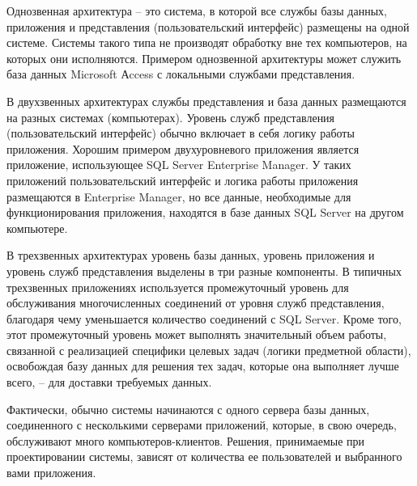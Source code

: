 \bigskip
Однозвенная архитектура – это система, в которой все службы базы данных, приложения и представления (пользовательский интерфейс) размещены на одной системе. Системы такого типа не производят обработку вне тех компьютеров, на которых они исполняются. Примером однозвенной архитектуры может служить база данных Microsoft Аccess с локальными службами представления.

\bigskip
В двухзвенных архитектурах службы представления и база данных размещаются на разных системах (компьютерах). Уровень служб представления (пользовательский интерфейс) обычно включает в себя логику работы приложения. Хорошим примером двухуровневого приложения является приложение, использующее SQL Server Enterprise Manager. У таких приложений пользовательский интерфейс и логика работы приложения размещаются в Enterprise Manager, но все данные, необходимые для функционирования приложения, находятся в базе данных SQL Server на другом компьютере.

\bigskip
В трехзвенных архитектурах уровень базы данных, уровень приложения и уровень служб представления выделены в три разные компоненты. В типичных трехзвенных приложениях используется промежуточный уровень для обслуживания многочисленных соединений от уровня служб представления, благодаря чему уменьшается количество соединений с SQL Server. Кроме того, этот промежуточный уровень может выполнять значительный объем работы, связанной с реализацией специфики целевых задач (логики предметной области), освобождая базу данных для решения тех задач, которые она выполняет лучше всего, – для доставки требуемых данных.

\bigskip
Фактически, обычно системы начинаются с одного сервера базы данных, соединенного с несколькими серверами приложений, которые, в свою очередь, обслуживают много компьютеров-клиентов. Решения, принимаемые при проектировании системы, зависят от количества ее пользователей и выбранного вами приложения.